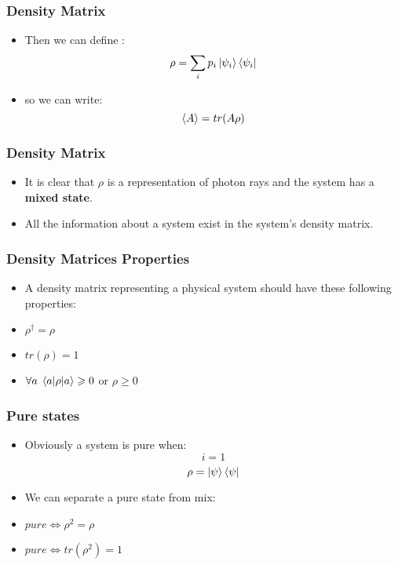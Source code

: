 \documentclass[11pt]{beamer}
\begin{document}
\begin{frame}
\frametitle{Density Matrix}

\begin{itemize}
 \item  Then we can define : $$\rho = \sum_i p_i \ket{\psi_i}\bra{\psi_i} $$
 \item  so we can write: $$\braket{A} = tr(A\rho) $$
 
\end{itemize}

\end{frame}

\begin{frame}
\frametitle{Density Matrix}

\begin{itemize}
 \item  It is clear that $\rho$ is a representation of photon rays 
and the system has a \textbf{mixed state}.
 \item  All the information about a system exist in the system's density matrix.

\end{itemize}

\end{frame}

\begin{frame}
\frametitle{Density Matrices Properties}

\begin{itemize}
 \item  A density matrix representing a physical system should have these following properties:
 \item  $\rho^\dag = \rho$
 \item  $tr(\rho) = 1$
 \item  $\forall a \; \braket{a|\rho|a} \geqslant 0$ or $\rho \geqslant 0$
\end{itemize}

\end{frame}

\begin{frame}
\frametitle{Pure states}

\begin{itemize}
 \item  Obviously a system is pure when:
    $$i={1}$$
    $$\rho = \ket{\psi}\bra{\psi}$$
 \item  We can separate a pure state from mix:
 \item  $pure \iff \rho^2 = \rho$
 \item  $pure \iff tr(\rho^2)=1 $
\end{itemize}

\end{frame}
\end{document}
